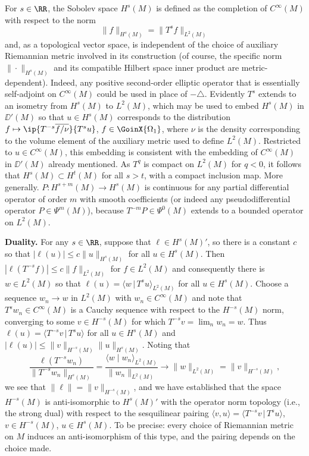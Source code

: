  For $s\in\RR$, the Sobolev space $H^s(M)$ is defined as the completion of $C^\infty(M)$ with respect to the norm
 \begin{equation*}
 	\|f\|_{H^s(M)} = \| T^s f\|_{L^2(M)}
 \end{equation*}
 and, as a topological vector space, is independent of the choice of auxiliary Riemannian metric involved in its construction (of course, the specific norm $\|\cdot\|_{H^s(M)}$
 and its compatible Hilbert space inner product
 are metric-dependent). Indeed, any positive second-order elliptic operator that is essentially self-adjoint on $C^\infty(M)$ could be used in place of $-\triangle$.
 Evidently $T^s$ extends to an isometry from $H^s(M)$ to $L^2(M)$, which may be used to embed $H^s(M)$ in $\DD'(M)$ so that $u \in H^s(M)$ corresponds to the distribution $f\mapsto \ip{T^{-s}\overline{f/\nu}}{T^su}$, $f\in\GoinX{\Omega_1}$, where $\nu$ is the density corresponding to the
 volume element of the auxiliary metric used to define $L^2(M)$. Restricted to $u\in C^\infty(M)$, this embedding is consistent with the embedding of $C^\infty(M)$ in $\DD'(M)$ already mentioned.
 As $T^q$ is compact on $L^2(M)$ for $q<0$, it follows that $H^s(M)\subset H^t(M)$ for all $s>t$, with a compact inclusion map. More generally. $P\colon H^{s+m}(M)\to H^s(M)$ is continuous for any partial differential operator of order $m$ with smooth coefficients (or indeed any pseudodifferential operator $P\in \Psi^{m}(M)$), because $T^{-m}P\in \Psi^0(M)$ extends to a bounded operator on $L^2(M)$.


 {\bf Duality.} For any $s\in\RR$, suppose that $\ell\in H^s(M)'$, so there is a constant $c$ so that $|\ell(u)|\le c\|u\|_{H^s(M)}$ for all $u\in H^s(M)$. Then $|\ell(T^{-s}f)|\le c\|f\|_{L^2(M)}$ for $f\in L^2(M)$ and consequently there is $w\in L^2(M)$ so that $\ell(u) =\langle w\,|\, T^{s}u\rangle_{L^2(M)}$ for all $u\in H^s(M)$. Choose a sequence $w_n\to w$ in $L^2(M)$ with
 $w_n\in C^\infty(M)$ and note that $T^s w_n\in C^\infty(M)$ is a Cauchy sequence with respect to the
 $H^{-s}(M)$ norm, converging to some $v\in H^{-s}(M)$ for which
 $T^{-s}v=\lim_n w_n=w$. Thus
 $\ell(u)=\langle T^{-s}v\, |\,T^su\rangle$ for all $u\in H^s(M)$ and
 $|\ell(u)|\le \|v\|_{H^{-s}(M)}\|u\|_{H^s(M)}$. Noting that
 \begin{equation*}
 	\frac{\ell(T^{-s}w_n)}{\|T^{-s}w_n\|_{H^s(M)}}=\frac{\langle w\mid w_n \rangle_{L^2(M)}}{\|w_n\|_{L^2(M)}}\to \|w\|_{L^2(M)} = \|v\|_{H^{-s}(M)},
 \end{equation*}
 we see that $\|\ell\|=\|v\|_{H^{-s}(M)}$, and we have established that
 the space $H^{-s}(M)$ is anti-isomorphic to $H^s(M)'$ with the operator norm topology (i.e.,
 the strong dual) with respect to the sesquilinear pairing $\langle v,u\rangle = \langle T^{-s}v\,|\, T^s u\rangle$, $v\in H^{-s}(M)$, $u\in H^s(M)$. To be precise: every
 choice of Riemannian metric on $M$ induces an anti-isomorphism of this type, and the
 pairing depends on the choice made.

